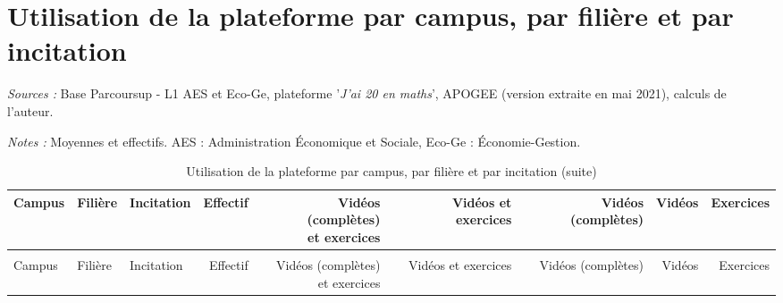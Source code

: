 \documentclass[
]{book}
\begin{document}
\setcounter{table}{0}
\setcounter{figure}{0}

\hypertarget{g20cfztreat}{%
\section{Utilisation de la plateforme par campus, par filière et par incitation}\label{g20cfztreat}}

\begingroup\fontsize{8}{10}\selectfont

\begin{ThreePartTable}
\begin{TableNotes}
\item \textit{Sources :} Base Parcoursup - L1 AES et Eco-Ge, plateforme '\textit{J'ai 20 en maths}', APOGEE (version extraite en mai 2021), calculs de l'auteur.
\item \textit{Notes :} Moyennes et effectifs. AES : Administration Économique et Sociale, Eco-Ge : Économie-Gestion.
\end{TableNotes}
\begin{longtable}[t]{lllrrrrrr}
\caption{\label{tab:g20cfztreat}Utilisation de la plateforme par campus, par filière et par incitation}\\
\toprule
\makecell{Campus \\ \ } & \makecell{Filière \\ \ } & \makecell{Incitation \\ \ } & \makecell{Effectif \\ \ } & \makecell{Vidéos (complètes) \\ et exercices} & \makecell{Vidéos et exercices \\ \ } & \makecell{Vidéos (complètes) \\ \ } & \makecell{Vidéos \\ \ } & \makecell{Exercices \\ \ }\\
\midrule
\endfirsthead
\caption[]{\label{tab:g20cfztreat}Utilisation de la plateforme par campus, par filière et par incitation (suite)}\\
\toprule
\makecell{Campus \\ \ } & \makecell{Filière \\ \ } & \makecell{Incitation \\ \ } & \makecell{Effectif \\ \ } & \makecell{Vidéos (complètes) \\ et exercices} & \makecell{Vidéos et exercices \\ \ } & \makecell{Vidéos (complètes) \\ \ } & \makecell{Vidéos \\ \ } & \makecell{Exercices \\ \ }\\
\midrule
\endhead


\end{longtable}
\end{ThreePartTable}
\end{document}
